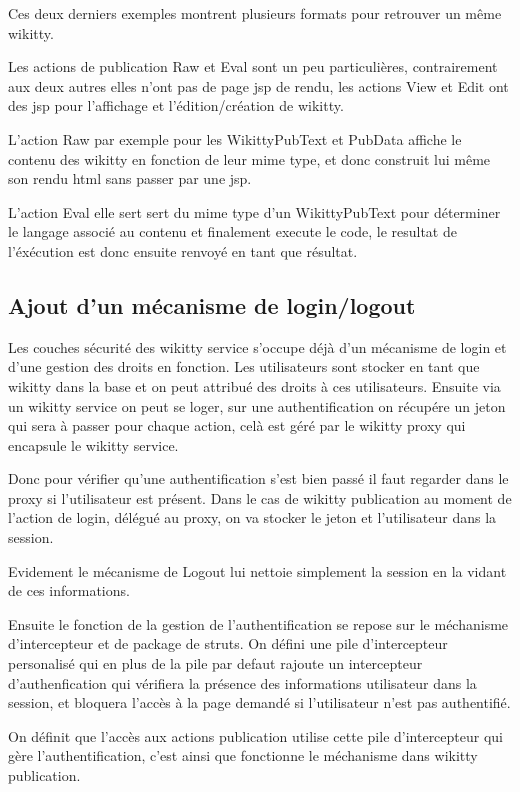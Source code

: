 Ces deux derniers exemples montrent plusieurs formats pour retrouver un même
wikitty. 

Les actions de publication Raw et Eval sont un peu particulières, contrairement
aux deux autres elles n'ont pas de page jsp de rendu, les actions View et Edit
ont des jsp pour l'affichage et l'édition/création de wikitty.

L'action Raw par exemple pour les WikittyPubText et PubData affiche le contenu
des wikitty en fonction de leur mime type, et donc construit lui même son rendu
html sans passer par une jsp.

L'action Eval elle sert sert du mime type d'un WikittyPubText pour déterminer le
langage associé au contenu et finalement execute le code, le resultat de
l'éxécution est donc ensuite renvoyé en tant que résultat.


\subsection{Ajout d'un mécanisme de login/logout}

Les couches sécurité des wikitty service s'occupe déjà d'un mécanisme de login
et d'une gestion des droits en fonction. Les utilisateurs sont stocker en tant
que wikitty dans la base et on peut attribué des droits à ces utilisateurs.
Ensuite via un wikitty service on peut se loger, sur une authentification on
récupére un jeton qui sera à passer pour chaque action, celà est géré par le
wikitty proxy qui encapsule le wikitty service.

Donc pour vérifier qu'une authentification s'est bien passé il faut regarder
dans le proxy si l'utilisateur est présent. Dans le cas de wikitty publication
au moment de l'action de login, délégué au proxy, on va stocker le jeton et
l'utilisateur dans la session.

Evidement le mécanisme de Logout lui nettoie simplement la session en la vidant
de ces informations.

Ensuite le fonction de la gestion de l'authentification se repose sur le
méchanisme d'intercepteur et de package de struts. On défini une pile
d'intercepteur personalisé qui en plus de la pile par defaut rajoute un
intercepteur d'authenfication qui vérifiera la présence des informations
utilisateur dans la session, et bloquera l'accès à la page demandé si
l'utilisateur n'est pas authentifié.

On définit que l'accès aux actions publication utilise cette pile d'intercepteur
qui gère l'authentification, c'est ainsi que fonctionne le méchanisme dans
wikitty publication.


